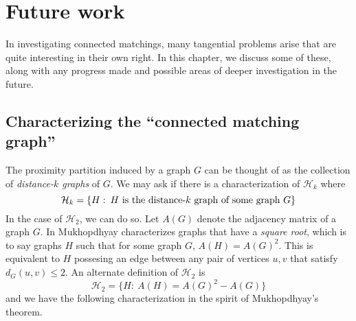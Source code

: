 \chapter{Future work}
In investigating connected matchings, many tangential problems arise that are quite interesting in their own right.  In this chapter, we discuss some of these, along with any progress made and possible areas of deeper investigation in the future.

\section{Characterizing the ``connected matching graph''}

The proximity partition induced by a graph $G$ can be thought of as the collection of \textit{distance-$k$ graphs} of $G$.
%
We may ask if there is a characterization of $\mathcal{H}_k$ where
%
\[\mathcal{H}_k = \{H :\: H \makebox{ is the distance-$k$ graph of some graph } G\}\]
%
In the case of $\mathcal{H}_2$, we can do so.
%
Let $A(G)$ denote the adjacency matrix of a graph $G$.  
%
In \cite{sqrtofgraph} Mukhopdhyay characterizes graphs that have a \textit{square root}, which is to say graphs $H$ such that for some graph $G$, $A(H) = A(G)^2$.
%  
This is equivalent to $H$ possesing an edge between any pair of vertices $u,v$ that satisfy $d_G(u,v) \leq 2$.  
%
\noindent An alternate definition of $\mathcal{H}_2$ is 
\[\mathcal{H}_2 = \{H : \: A(H) = A(G)^2-A(G)\}\] and we have the following characterization in the spirit of Mukhopdhyay's theorem.  
